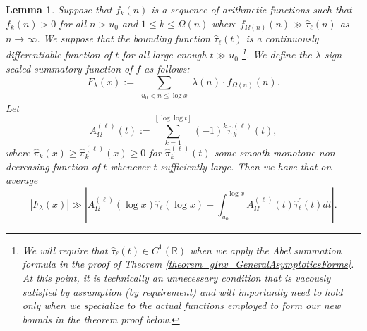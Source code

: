 \documentclass[11pt,reqno,a4letter]{article}
\numberwithin{figure}{section}
\numberwithin{table}{section}
\newcommand{\floor}[1]{\left\lfloor #1 \right\rfloor}
\theoremstyle{plain}
\newtheorem{lemma}[theorem]{Lemma}
\numberwithin{theorem}{section}
\theoremstyle{definition}
\newcommand{\SuccSim}[0]{\overset{_{\scriptsize{\blacktriangle}}}{\succsim}}
\renewcommand{\SuccSim}[0]{\ensuremath{\gg}}
\begin{document}
\begin{lemma} 
\label{lemma_CLT_and_AbelSummation} 
Suppose that $f_k(n)$ is a sequence of arithmetic functions 
such that $f_k(n) > 0$ for all $n > u_0$ and $1 \leq k \leq \Omega(n)$ where 
$f_{\Omega(n)}(n) \SuccSim \widehat{\tau}_{\ell}(n)$ as $n \rightarrow \infty$. We suppose that 
the bounding function $\widehat{\tau}_{\ell}(t)$ is a continuously differentiable function of $t$ for all 
large enough $t \gg u_0$ \footnote{ 
     We will require that $\widehat{\tau}_{\ell}(t) \in C^{1}(\mathbb{R})$ when we apply the 
     Abel summation formula in the proof of Theorem \ref{theorem_gInv_GeneralAsymptoticsForms}. 
     At this point, it is technically an unnecessary condition that is 
     vacously satisfied by assumption (by requirement) 
     and will importantly need to hold only when we specialize to the 
     actual functions employed to form our new bounds in the theorem proof below. 
}.  
We define the $\lambda$-sign-scaled summatory function of $f$ as follows: 
\[
F_{\lambda}(x) := \sum_{\substack{u_0 < n \leq \log x}} 
     \lambda(n) \cdot f_{\Omega(n)}(n). 
\]
Let 
\[
A_{\Omega}^{(\ell)}(t) := \sum_{k=1}^{\floor{\log\log t}} (-1)^k \widehat{\pi}_k^{(\ell)}(t),  
\]
where $\widehat{\pi}_k(x) \geq \widehat{\pi}_k^{(\ell)}(x) \geq 0$ for 
$\widehat{\pi}_k^{(\ell)}(t)$ some smooth monotone non-decreasing 
function of $t$ whenever $t$ sufficiently large. 
Then we have that on average 
\[
|F_{\lambda}(x)| \SuccSim \left\lvert 
     A_{\Omega}^{(\ell)}(\log x) \widehat{\tau}_{\ell}(\log x) - 
     \int_{u_0}^{\log x} 
     A_{\Omega}^{(\ell)}(t) \widehat{\tau}_{\ell}^{\prime}(t) dt 
     \right\rvert.  
\]
\end{lemma}
\end{document}
